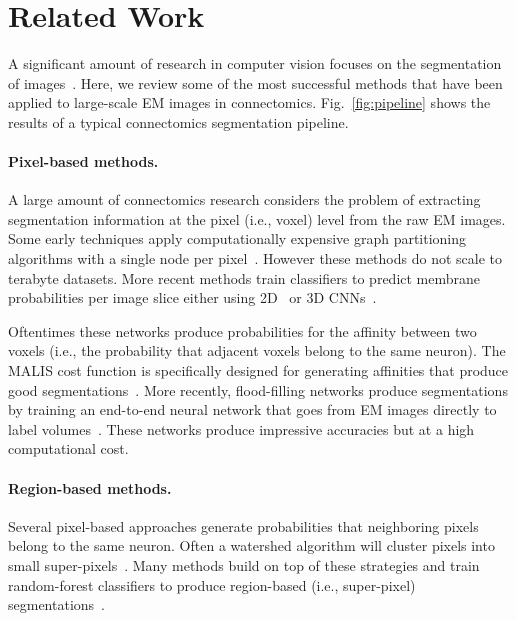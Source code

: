 \section{Related Work}

A significant amount of research in computer vision focuses on the segmentation of images~\cite{zaitoun2015survey}. Here, we review some of the most successful methods that have been applied to large-scale EM images in connectomics. Fig.~\ref{fig:pipeline} shows the results of a typical connectomics segmentation pipeline.

\paragraph{Pixel-based methods.}
A large amount of connectomics research considers the problem of extracting segmentation information at the pixel (i.e., voxel) level from the raw EM images. Some early techniques apply computationally expensive graph partitioning algorithms with a single node per pixel~\cite{andres2012globally}. However these methods do not scale to terabyte datasets. More recent methods train classifiers to predict membrane probabilities per image slice either using 2D~\cite{ciresan2012deep,jain2010boundary,kaynig2015large,seymour2016rhoananet,amelio_segmentation} or 3D CNNs~\cite{lee2015recursive,ronneberger2015u,turaga2010convolutional}.

Oftentimes these networks produce probabilities for the affinity between two voxels (i.e., the probability that adjacent voxels belong to the same neuron). The MALIS cost function is specifically designed for generating affinities that produce good segmentations~\cite{briggman2009maximin}. More recently, flood-filling networks produce segmentations by training an end-to-end neural network that goes from EM images directly to label volumes~\cite{januszewski2016flood}. These networks produce impressive accuracies but at a high computational cost.

\paragraph{Region-based methods.}
Several pixel-based approaches generate probabilities that neighboring pixels belong to the same neuron.
Often a watershed algorithm will cluster pixels into small super-pixels~\cite{zlateski2015image}.
Many methods build on top of these strategies and train random-forest classifiers to produce region-based (i.e., super-pixel) segmentations~\cite{seymour2016rhoananet,nunez2014graph,10.1371/journal.pone.0125825,parag2017anisotropic,zlateski2015image}.

